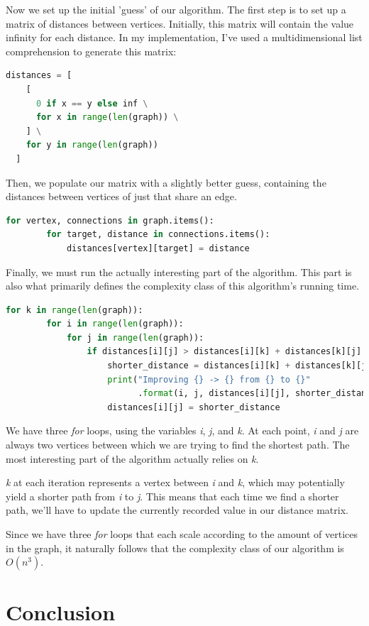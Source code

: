 \documentclass{article}
\begin{document}
Now we set up the initial 'guess' of our algorithm.
The first step is to set up a matrix of distances between vertices.
Initially, this matrix will contain the value infinity for each distance.
In my implementation, I've used a multidimensional list comprehension to generate this matrix:

\begin{lstlisting}[language=Python]
  distances = [
    [
      0 if x == y else inf \
      for x in range(len(graph)) \
    ] \
    for y in range(len(graph))
  ]
\end{lstlisting}

Then, we populate our matrix with a slightly better guess, containing the distances between vertices of just that share an edge.

\begin{lstlisting}[language=Python]
    for vertex, connections in graph.items():
        for target, distance in connections.items():
            distances[vertex][target] = distance
\end{lstlisting}

Finally, we must run the actually interesting part of the algorithm.
This part is also what primarily defines the complexity class of this algorithm's running time.

\begin{lstlisting}[language=Python]
  for k in range(len(graph)):
        for i in range(len(graph)):
            for j in range(len(graph)):
                if distances[i][j] > distances[i][k] + distances[k][j]:
                    shorter_distance = distances[i][k] + distances[k][j]
                    print("Improving {} -> {} from {} to {}"
                          .format(i, j, distances[i][j], shorter_distance))
                    distances[i][j] = shorter_distance
\end{lstlisting}

We have three {\em for} loops, using the variables {\em i}, {\em j}, and {\em k}.
At each point, {\em i} and {\em j} are always two vertices between which we are trying to find the shortest path. The most interesting part of the algorithm actually relies on {\em k}.

{\em k} at each iteration represents a vertex between {\em i} and {\em k}, which may potentially yield a shorter path from {\em i} to {\em j}. This means that each time we find a shorter path, we'll have to update the currently recorded value in our distance matrix.

Since we have three {\em for} loops that each scale according to the amount of vertices in the graph,
it naturally follows that the complexity class of our algorithm is \(O(n^3)\).

\newpage

\section{Conclusion}
\end{document}
